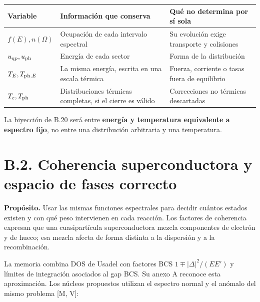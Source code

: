 \documentclass[
  spanish,
  10pt,
  a4paper,
]{article}
\newcounter{none} %
\begin{document}
{\def\LTcaptype{none} %
\begin{longtable}[]{@{}
  >{\raggedright\arraybackslash}p{}
  >{\raggedright\arraybackslash}p{}
  >{\raggedright\arraybackslash}p{}@{}}
\toprule\noalign{}
\begin{minipage}[b]{\linewidth}\raggedright
Variable
\end{minipage} & \begin{minipage}[b]{\linewidth}\raggedright
Información que conserva
\end{minipage} & \begin{minipage}[b]{\linewidth}\raggedright
Qué no determina por sí sola
\end{minipage} \\
\midrule\noalign{}
\endhead
\bottomrule\noalign{}
\endlastfoot
\(f(E),n(\Omega)\) & Ocupación de cada intervalo espectral & Su
evolución exige transporte y colisiones \\
\(u_{\rm qp},u_{\rm ph}\) & Energía de cada sector & Forma de la
distribución \\
\(T_E,T_{{\rm ph},E}\) & La misma energía, escrita en una escala térmica
& Fuerza, corriente o tasas fuera de equilibrio \\
\(T_e,T_{\rm ph}\) & Distribuciones térmicas completas, si el cierre es
válido & Correcciones no térmicas descartadas \\
\end{longtable}
}

La biyección de B.20 será entre \textbf{energía y temperatura
equivalente a espectro fijo}, no entre una distribución arbitraria y una
temperatura.

\section{B.2. Coherencia superconductora y espacio de fases
correcto}\label{b.2.-coherencia-superconductora-y-espacio-de-fases-correcto}

\textbf{Propósito.} Usar las mismas funciones espectrales para decidir
cuántos estados existen y con qué peso intervienen en cada reacción. Los
factores de coherencia expresan que una cuasipartícula superconductora
mezcla componentes de electrón y de hueco; esa mezcla afecta de forma
distinta a la dispersión y a la recombinación.

La memoria combina DOS de Usadel con factores BCS
\(1\mp |\Delta|^2/(EE')\) y límites de integración asociados al gap BCS.
Su anexo A reconoce esta aproximación. Los núcleos propuestos utilizan
el espectro normal y el anómalo del mismo problema {[}M, V{]}:
\end{document}
